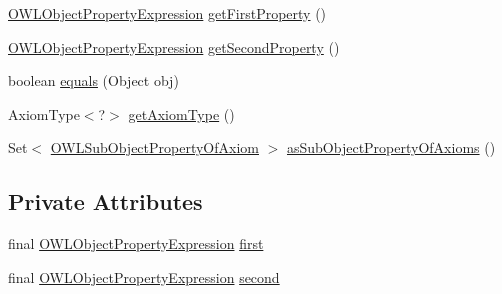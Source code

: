 \begin{DoxyCompactItemize}
\item 
\hyperlink{interfaceorg_1_1semanticweb_1_1owlapi_1_1model_1_1_o_w_l_object_property_expression}{O\-W\-L\-Object\-Property\-Expression} \hyperlink{classuk_1_1ac_1_1manchester_1_1cs_1_1owl_1_1owlapi_1_1_o_w_l_inverse_object_properties_axiom_impl_ac643dbfe94a0b77c4c3071be85638e7d}{get\-First\-Property} ()
\item 
\hyperlink{interfaceorg_1_1semanticweb_1_1owlapi_1_1model_1_1_o_w_l_object_property_expression}{O\-W\-L\-Object\-Property\-Expression} \hyperlink{classuk_1_1ac_1_1manchester_1_1cs_1_1owl_1_1owlapi_1_1_o_w_l_inverse_object_properties_axiom_impl_a00cf3c04b5d38d379ad9d97ae6e0029c}{get\-Second\-Property} ()
\item 
boolean \hyperlink{classuk_1_1ac_1_1manchester_1_1cs_1_1owl_1_1owlapi_1_1_o_w_l_inverse_object_properties_axiom_impl_ae421d20c7001469afadb2202be4ae2a1}{equals} (Object obj)
\item 
Axiom\-Type$<$?$>$ \hyperlink{classuk_1_1ac_1_1manchester_1_1cs_1_1owl_1_1owlapi_1_1_o_w_l_inverse_object_properties_axiom_impl_ab21be4744320d86fe780ebc19c7469bd}{get\-Axiom\-Type} ()
\item 
Set$<$ \hyperlink{interfaceorg_1_1semanticweb_1_1owlapi_1_1model_1_1_o_w_l_sub_object_property_of_axiom}{O\-W\-L\-Sub\-Object\-Property\-Of\-Axiom} $>$ \hyperlink{classuk_1_1ac_1_1manchester_1_1cs_1_1owl_1_1owlapi_1_1_o_w_l_inverse_object_properties_axiom_impl_a51294ac944d97fb1e4d7f224a5d5d44b}{as\-Sub\-Object\-Property\-Of\-Axioms} ()
\end{DoxyCompactItemize}
\subsection*{Private Attributes}
\begin{DoxyCompactItemize}
\item 
final \hyperlink{interfaceorg_1_1semanticweb_1_1owlapi_1_1model_1_1_o_w_l_object_property_expression}{O\-W\-L\-Object\-Property\-Expression} \hyperlink{classuk_1_1ac_1_1manchester_1_1cs_1_1owl_1_1owlapi_1_1_o_w_l_inverse_object_properties_axiom_impl_ada71fd5f5ef70e63d611fbe578e67eef}{first}
\item 
final \hyperlink{interfaceorg_1_1semanticweb_1_1owlapi_1_1model_1_1_o_w_l_object_property_expression}{O\-W\-L\-Object\-Property\-Expression} \hyperlink{classuk_1_1ac_1_1manchester_1_1cs_1_1owl_1_1owlapi_1_1_o_w_l_inverse_object_properties_axiom_impl_a374ea4f80e6d00fb7cf293e560f9dae1}{second}
\end{DoxyCompactItemize}
